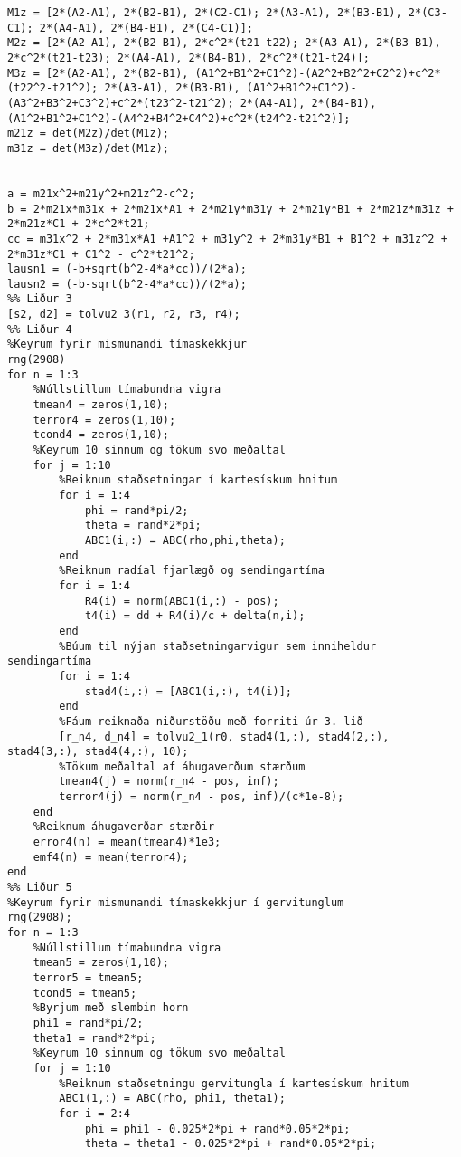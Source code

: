 \documentclass[11pt]{article}
\begin{document}
\begin{verbatim}
M1z = [2*(A2-A1), 2*(B2-B1), 2*(C2-C1); 2*(A3-A1), 2*(B3-B1), 2*(C3-C1); 2*(A4-A1), 2*(B4-B1), 2*(C4-C1)];
M2z = [2*(A2-A1), 2*(B2-B1), 2*c^2*(t21-t22); 2*(A3-A1), 2*(B3-B1), 2*c^2*(t21-t23); 2*(A4-A1), 2*(B4-B1), 2*c^2*(t21-t24)];
M3z = [2*(A2-A1), 2*(B2-B1), (A1^2+B1^2+C1^2)-(A2^2+B2^2+C2^2)+c^2*(t22^2-t21^2); 2*(A3-A1), 2*(B3-B1), (A1^2+B1^2+C1^2)-(A3^2+B3^2+C3^2)+c^2*(t23^2-t21^2); 2*(A4-A1), 2*(B4-B1),(A1^2+B1^2+C1^2)-(A4^2+B4^2+C4^2)+c^2*(t24^2-t21^2)];
m21z = det(M2z)/det(M1z);
m31z = det(M3z)/det(M1z);


a = m21x^2+m21y^2+m21z^2-c^2;
b = 2*m21x*m31x + 2*m21x*A1 + 2*m21y*m31y + 2*m21y*B1 + 2*m21z*m31z + 2*m21z*C1 + 2*c^2*t21;
cc = m31x^2 + 2*m31x*A1 +A1^2 + m31y^2 + 2*m31y*B1 + B1^2 + m31z^2 + 2*m31z*C1 + C1^2 - c^2*t21^2;
lausn1 = (-b+sqrt(b^2-4*a*cc))/(2*a);
lausn2 = (-b-sqrt(b^2-4*a*cc))/(2*a);
%% Liður 3
[s2, d2] = tolvu2_3(r1, r2, r3, r4);
%% Liður 4
%Keyrum fyrir mismunandi tímaskekkjur
rng(2908)
for n = 1:3
    %Núllstillum tímabundna vigra
    tmean4 = zeros(1,10);
    terror4 = zeros(1,10);
    tcond4 = zeros(1,10);
    %Keyrum 10 sinnum og tökum svo meðaltal
    for j = 1:10
        %Reiknum staðsetningar í kartesískum hnitum
        for i = 1:4
            phi = rand*pi/2;
            theta = rand*2*pi;
            ABC1(i,:) = ABC(rho,phi,theta);
        end
        %Reiknum radíal fjarlægð og sendingartíma
        for i = 1:4
            R4(i) = norm(ABC1(i,:) - pos);
            t4(i) = dd + R4(i)/c + delta(n,i);
        end
        %Búum til nýjan staðsetningarvigur sem inniheldur sendingartíma
        for i = 1:4
            stad4(i,:) = [ABC1(i,:), t4(i)];
        end
        %Fáum reiknaða niðurstöðu með forriti úr 3. lið
        [r_n4, d_n4] = tolvu2_1(r0, stad4(1,:), stad4(2,:), stad4(3,:), stad4(4,:), 10);
        %Tökum meðaltal af áhugaverðum stærðum
        tmean4(j) = norm(r_n4 - pos, inf);
        terror4(j) = norm(r_n4 - pos, inf)/(c*1e-8);
    end
    %Reiknum áhugaverðar stærðir
    error4(n) = mean(tmean4)*1e3;
    emf4(n) = mean(terror4);
end
%% Liður 5
%Keyrum fyrir mismunandi tímaskekkjur í gervitunglum
rng(2908);
for n = 1:3
    %Núllstillum tímabundna vigra
    tmean5 = zeros(1,10);
    terror5 = tmean5;
    tcond5 = tmean5;
    %Byrjum með slembin horn
    phi1 = rand*pi/2; 
    theta1 = rand*2*pi;
    %Keyrum 10 sinnum og tökum svo meðaltal
    for j = 1:10
        %Reiknum staðsetningu gervitungla í kartesískum hnitum
        ABC1(1,:) = ABC(rho, phi1, theta1);
        for i = 2:4 
            phi = phi1 - 0.025*2*pi + rand*0.05*2*pi;
            theta = theta1 - 0.025*2*pi + rand*0.05*2*pi;

\end{verbatim}
\end{document}
